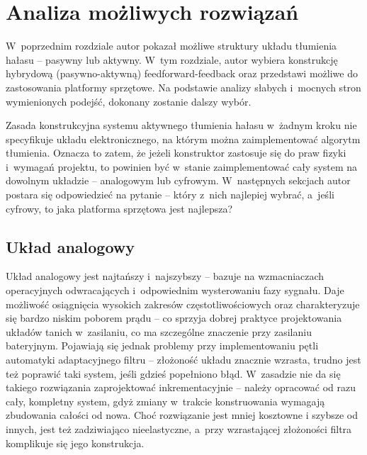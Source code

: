 \chapter{Analiza możliwych rozwiązań}
\label{cha:możliwe_układy}
 W~poprzednim rozdziale autor pokazał możliwe struktury układu tłumienia hałasu -- pasywny lub aktywny. W~tym rozdziale, autor wybiera konstrukcję hybrydową (pasywno-aktywną) feedforward-feedback oraz przedstawi możliwe do zastosowania platformy sprzętowe. Na podstawie analizy słabych i~mocnych stron wymienionych podejść, dokonany zostanie dalszy wybór.

 Zasada konstrukcyjna systemu aktywnego tłumienia hałasu w~żadnym kroku nie specyfikuje układu elektronicznego, na którym można zaimplementować algorytm tłumienia. Oznacza to zatem, że jeżeli konstruktor zastosuje się do praw fizyki i~wymagań projektu, to powinien być w~stanie zaimplementować cały system na dowolnym układzie -- analogowym lub cyfrowym. W~następnych sekcjach autor postara się odpowiedzieć na pytanie -- który z~nich najlepiej wybrać, a~jeśli cyfrowy, to jaka platforma sprzętowa jest najlepsza? 
\section{Układ analogowy}
\label{sec:analog}
Układ analogowy jest najtańszy i~najszybszy -- bazuje na wzmacniaczach operacyjnych odwracających i~odpowiednim wysterowaniu fazy sygnału. Daje możliwość osiągnięcia wysokich zakresów częstotliwościowych oraz charakteryzuje się bardzo niskim poborem prądu -- co sprzyja dobrej praktyce projektowania układów tanich w~zasilaniu, co ma szczególne znaczenie przy zasilaniu bateryjnym. Pojawiają się jednak problemy przy implementowaniu pętli automatyki adaptacyjnego filtru -- złożoność układu znacznie wzrasta, trudno jest też poprawić taki system, jeśli gdzieś popełniono błąd. W~zasadzie nie da się takiego rozwiązania zaprojektować inkrementacyjnie -- należy opracować od razu cały, kompletny system, gdyż zmiany w~trakcie konstruowania wymagają zbudowania całości od nowa. Choć rozwiązanie jest mniej kosztowne i szybsze od innych, jest też zadziwiająco nieelastyczne, a~przy wzrastającej złożoności filtra komplikuje się jego konstrukcja.
